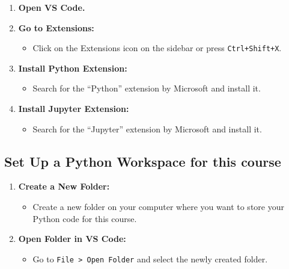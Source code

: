 \documentclass[
  letterpaper,
  DIV=11,
  numbers=noendperiod]{scrreprt}
\providecommand{\tightlist}{%
  \setlength{\itemsep}{0pt}\setlength{\parskip}{0pt}}\usepackage{longtable,booktabs,array}
\begin{document}
\begin{enumerate}
\def\labelenumi{\arabic{enumi}.}
\tightlist
\item
  \textbf{Open VS Code.}
\item
  \textbf{Go to Extensions:}

  \begin{itemize}
  \tightlist
  \item
    Click on the Extensions icon on the sidebar or press
    \texttt{Ctrl+Shift+X}.
  \end{itemize}
\item
  \textbf{Install Python Extension:}

  \begin{itemize}
  \tightlist
  \item
    Search for the ``Python'' extension by Microsoft and install it.
  \end{itemize}
\item
  \textbf{Install Jupyter Extension:}

  \begin{itemize}
  \tightlist
  \item
    Search for the ``Jupyter'' extension by Microsoft and install it.
  \end{itemize}
\end{enumerate}

\hypertarget{set-up-a-python-workspace-for-this-course}{%
\subsection{Set Up a Python Workspace for this
course}\label{set-up-a-python-workspace-for-this-course}}

\begin{enumerate}
\def\labelenumi{\arabic{enumi}.}
\tightlist
\item
  \textbf{Create a New Folder:}

  \begin{itemize}
  \tightlist
  \item
    Create a new folder on your computer where you want to store your
    Python code for this course.
  \end{itemize}
\item
  \textbf{Open Folder in VS Code:}

  \begin{itemize}
  \tightlist
  \item
    Go to \texttt{File\ \textgreater{}\ Open\ Folder} and select the
    newly created folder.
  \end{itemize}
\end{enumerate}
\end{document}
